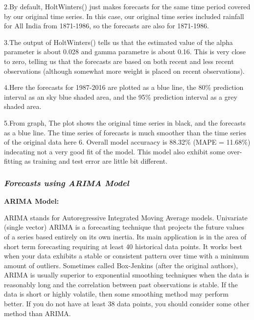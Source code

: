 \documentclass[12pt,openany]{book}
\begin{document}
2.By default, HoltWinters() just makes forecasts for the same time period covered by our original time series. In this case, our original time series included rainfall for All India from 1871-1986, so the forecasts are also for 1871-1986.

3.The output of HoltWinters() tells us that the estimated value of the alpha parameter is about 0.028 and gamma parametre is about 0.16. This is very close to zero, telling us that the forecasts are based on both recent and less recent observations (although somewhat more weight is placed on recent observations).

4.Here the forecasts for 1987-2016 are plotted as a blue line, the 80\% prediction interval as an sky blue shaded area, and the 95\% prediction interval as a grey shaded area.

5.From graph, The plot shows the original time series in black, and the forecasts as a blue line. The time series of forecasts is much smoother than the time series of the original data here
6. Overall model accuraacy is 88.32\% (MAPE = 11.68\%) indecating not a very good fit of the model. This model also exhibit some over-fitting as training and test error are little bit different.

\hypertarget{forecasts-using-arima-model}{%
\subsubsection{\texorpdfstring{\textbf{\textbf{\emph{Forecasts using ARIMA Model}}}}{Forecasts using ARIMA Model}}\label{forecasts-using-arima-model}}

\textbf{ARIMA Model:}

ARIMA stands for Autoregressive Integrated Moving Average models. Univariate (single vector) ARIMA is a forecasting technique that projects the future values of a series based entirely on its own inertia. Its main application is in the area of short term forecasting requiring at least 40 historical data points. It works best when your data exhibits a stable or consistent pattern over time with a minimum amount of outliers. Sometimes called Box-Jenkins (after the original authors), ARIMA is usually superior to exponential smoothing techniques when the data is reasonably long and the correlation between past observations is stable. If the data is short or highly volatile, then some smoothing method may perform better. If you do not have at least 38 data points, you should consider some other method than ARIMA.
\end{document}
